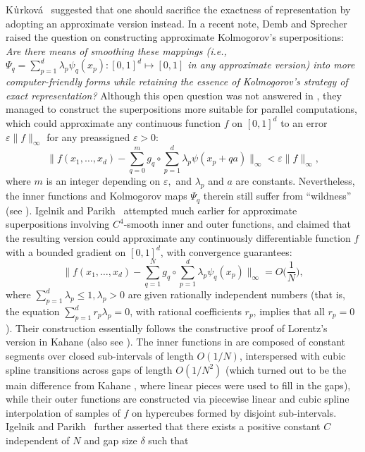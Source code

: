 \documentclass[10pt,reqno,final]{amsart}
\theoremstyle{remark}
\theoremstyle{definition}
\newcommand{\wll}[1]{#1}
\begin{document}
K{$\dot {\rm u}$}rkov{\'a}~\cite{Kourkova1991,Kuurkova1992kolmogorov} suggested that one should sacrifice the exactness of representation by adopting an approximate version instead.   
In a recent note, Demb and Sprecher \cite{Demb2021note} raised the   question \wll{on constructing approximate Kolmogorov's superpositions}: 
 {\em Are there means of smoothing these mappings {\rm(}i.e., $\Psi_q=\sum_{p=1}^d \lambda_p \psi_q(x_p): [0,1]^d\mapsto [0,1]$  in any approximate version{\rm)} into more computer-friendly forms while retaining the essence of Kolmogorov's strategy of exact representation?} Although this open question was not answered in \cite{Demb2021note}, they managed to construct the superpositions more suitable for parallel computations, which could approximate any continuous function $f$ on 
$[0,1]^d$ to an error $\varepsilon\|f\|_\infty$ for any preassigned $\varepsilon>0:$
\begin{equation}\label{Demb-Sprecher21}
 \Big\|f(x_1,\ldots, x_d)-
 \sum_{q=0}^m g_q\circ \sum_{p=1}^d \lambda_p \psi(x_p+q a)\Big\|_\infty < \varepsilon \|f\|_\infty,   
\end{equation}
where $m$ is an integer depending on $\varepsilon,$ and $\lambda_p$ and $a$ are constants. Nevertheless,  the inner functions and Kolmogorov maps $\Psi_q$ therein still suffer from ``wildness'' (see \cite[Figure~2]{Demb2021note}). 
Igelnik and Parikh~\cite{Igelnik2003} attempted much earlier for approximate superpositions involving \( C^4 \)-smooth inner and outer functions, and claimed that the resulting version   could approximate any continuously differentiable function \( f \) with a bounded gradient on \( [0,1]^d \), with convergence guarantees:
\begin{equation}\label{IgeP03}
 \Big\|f(x_1,\ldots, x_d)-
 \sum_{q=1}^N g_q\circ \sum_{p=1}^d \lambda_p \psi_q(x_p)\Big\|_\infty =O\Big(\frac 1 N\Big),   
\end{equation}
 where $\sum_{p=1}^d \lambda_p \leq 1, \lambda_p>0$ are given rationally independent numbers (that is, the equation \( \sum_{p=1}^d r_p \lambda_p = 0 \), with rational coefficients \( r_p \), implies that all \( r_p = 0 \)). 
 Their construction essentially follows the constructive proof of Lorentz's version in Kahane \cite{Kahane1975} (also see \cite{Morris2021Hilbert13}).
The inner functions in \cite{Igelnik2003} are composed of constant segments over closed sub-intervals of length $O(1/N)$, interspersed with cubic spline transitions across gaps of length  $O(1/N^2)$ (which turned out to be the \wll{main} difference from Kahane \cite{Kahane1975},  where linear pieces were used to fill in the gaps), while their outer functions are constructed via piecewise linear and cubic spline interpolation of samples of \( f \) on hypercubes formed by disjoint sub-intervals. Igelnik and Parikh~\cite{Igelnik2003} further asserted that there exists a positive constant $C$ independent of $N$ and gap size $\delta$ such that  
\end{document}

